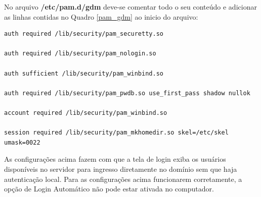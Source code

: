 No arquivo \textbf{/etc/pam.d/gdm} deve-se comentar todo o seu conteúdo e adicionar as linhas contidas no Quadro \ref{pam_gdm} ao inicio do arquivo:\\

\pagebreak

\begin{lstlisting}[caption=Arquivo /etc/pam.d/gdm,label={pam_gdm}]	
auth required /lib/security/pam_securetty.so

auth required /lib/security/pam_nologin.so

auth sufficient /lib/security/pam_winbind.so

auth required /lib/security/pam_pwdb.so use_first_pass shadow nullok

account required /lib/security/pam_winbind.so

session required /lib/security/pam_mkhomedir.so skel=/etc/skel umask=0022
\end{lstlisting}

As configurações acima fazem com que a tela de login exiba os usuários disponíveis no servidor para ingresso diretamente no domínio sem que haja autenticação local. Para as configurações acima funcionarem corretamente, a opção de Login Automático não pode estar ativada no computador.